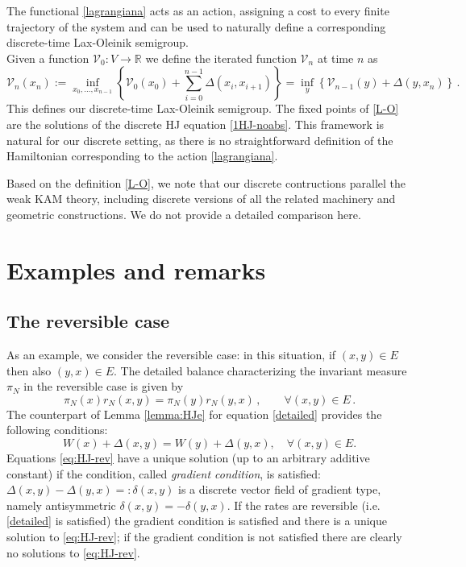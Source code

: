 \documentclass[reqno]{amsart}
\theoremstyle{plain}
\theoremstyle{definition}
\theoremstyle{remark}
\numberwithin{equation}{section}
\numberwithin{theorem}{section}
\newcommand{\<}{\langle}
\renewcommand{\>}{\rangle}
\begin{document}
The functional \eqref{lagrangiana} acts as an action, assigning a cost to every finite trajectory of the system and can be used to naturally define  a corresponding discrete-time Lax-Oleinik semigroup.\\

Given  a function $\mathcal V_0:V\to \mathbb R$ we define the iterated function $\mathcal V_n$ at time $n$ as
\begin{equation}\label{L-O}
	\mathcal V_n(x_n):= \inf_{x_0,\dots ,x_{n-1}} \left\{\mathcal V_0(x_0)+\sum_{i=0}^{n-1}\Delta(x_i,x_{i+1})\right\}=\inf_{y} \left\{\mathcal V_{n-1}(y)+\Delta(y,x_n)\right\}\,.
\end{equation} 
This defines our discrete-time Lax-Oleinik semigroup. The fixed points of \eqref{L-O} are the solutions of the discrete HJ equation \eqref{1HJ-noabs}. This framework is natural for our discrete setting, as there is no straightforward definition of the Hamiltonian corresponding to the action \eqref{lagrangiana}.

Based on the definition \eqref{L-O}, we note that our discrete contructions parallel the weak KAM theory, including discrete versions of all the related machinery and geometric constructions. We do not provide a detailed comparison here.



\section{Examples and remarks}

\subsection{The reversible case}

As an example, we consider the reversible case: in this situation, if $(x,y)\in E$ then also $(y,x)\in E$. The detailed balance characterizing the invariant measure $\pi_N$ in the reversible case is given by 
\begin{equation}\label{detailed}
	\pi_N(x) r_N(x,y)= \pi_N(y)r_N(y,x)\,, \qquad  \forall(x,y)\in E\,.
\end{equation}
The counterpart of Lemma \ref{lemma:HJe} for  equation \eqref{detailed} provides the following conditions:
\begin{equation}\label{eq:HJ-rev}
	W(x)+ \Delta(x,y)=W(y)+\Delta(y,x), \quad  \forall(x,y)\in E.
\end{equation}
Equations \eqref{eq:HJ-rev} have a unique solution (up to an arbitrary additive constant) if the condition, called \emph{gradient condition}, is satisfied: $\Delta(x,y)-\Delta(y,x)=:\delta(x,y)$ is a discrete vector field of gradient type, namely antisymmetric $\delta(x,y)=-\delta(y,x)$. If the rates are reversible (i.e. \eqref{detailed} is satisfied) the gradient condition is satisfied and there is a unique solution to \eqref{eq:HJ-rev}; if the gradient condition is not satisfied there are clearly no solutions to \eqref{eq:HJ-rev}. 
\end{document}
